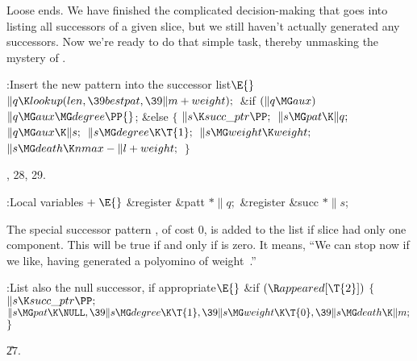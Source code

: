 Loose ends. We have finished the complicated
decision-making that goes
into listing all successors of a given slice, but we still haven't
actually generated any successors. Now we're ready to do that simple task,
thereby unmasking the mystery of .

\Y\B\4:Insert the new pattern into the successor list\X${}\E{}$\6
$\|q\K\\{lookup}(\\{len},\39\\{bestpat},\39\|m+\\{weight});{}$\6
\&{if} ${}(\|q\MG\\{aux}){}$\1\5
${}\|q\MG\\{aux}\MG\\{degree}\PP{}$;\2\6
\&{else}\5
${}\{{}$\1\6
${}\|s\K\\{succ\_ptr}\PP;{}$\6
${}\|s\MG\\{pat}\K\|q;{}$\6
${}\|q\MG\\{aux}\K\|s;{}$\6
${}\|s\MG\\{degree}\K\T{1};{}$\6
${}\|s\MG\\{weight}\K\\{weight};{}$\6
${}\|s\MG\\{death}\K\\{nmax}-\|l+\\{weight};{}$\6
\4${}\}{}$\2\par
{}, 28, 29.\fi

\B{}:Local variables\X${}\mathrel+\E{}$\6
\&{register} \&{patt} ${}{*}\|q;{}$\6
\&{register} \&{succ} ${}{*}\|s{}$;\par
\fi

The special successor pattern \PB{$\NULL$}, of cost 0, is
added to the list
if slice  had only one component. This will be true if and only
if  is zero. It means, ``We can stop now if we like,
having
generated a polyomino of weight~.''

\Y\B\4:List also the null successor, if appropriate\X${}\E{}$\6
\&{if} ${}(\R\\{appeared}[\T{2}]){}$\5
${}\{{}$\1\6
${}\|s\K\\{succ\_ptr}\PP;{}$\6
${}\|s\MG\\{pat}\K\NULL,\39\|s\MG\\{degree}\K\T{1},\39\|s\MG\\{weight}\K\T{0},%
\39\|s\MG\\{death}\K\|m;{}$\6
\4${}\}{}$\2\par
\U27.\fi

